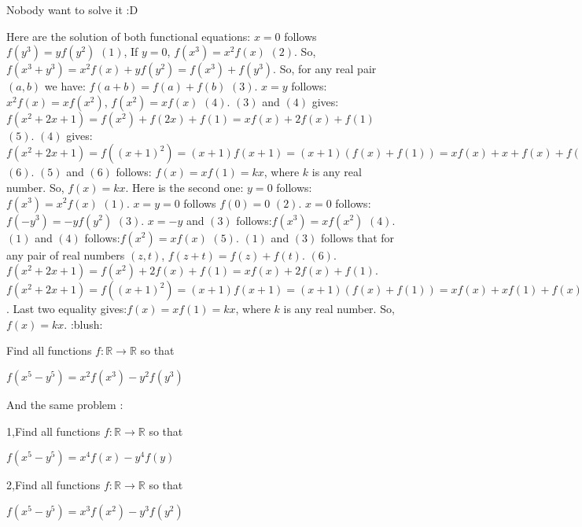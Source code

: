 \begin{mysolution}
	Nobody want to solve it  :D
\end{mysolution}



\begin{mysolution}
	Here are the solution of both functional equations:    
$ x = 0$ follows $ f(y^{3}) = yf(y^{2})$ $ (1)$, If $ y = 0$, $ f(x^{3}) = x^{2}f(x)$ $ (2)$. So, $ f(x^{3}+y^{3}) = x^{2}f(x)+yf(y^{2}) = f(x^{3})+f(y^{3})$. So, for any real pair $ (a,b)$ we have: $ f(a+b) = f(a)+f(b)$ $ (3)$. $ x = y$ follows: $ x^{2}f(x) = xf(x^{2})$, $ f(x^{2}) = xf(x)$ $ (4)$. 
$ (3)$ and $ (4)$ gives: $ f(x^{2}+2x+1) = f(x^{2})+f(2x)+f(1) = xf(x)+2f(x)+f(1)$ $ (5)$.
$ (4)$ gives: $ f(x^{2}+2x+1) = f((x+1)^{2}) = (x+1)f(x+1) = (x+1)(f(x)+f(1)) = xf(x)+x+f(x)+f(1)$ $ (6)$.
$ (5)$ and $ (6)$ follows: $ f(x) = xf(1) = kx$, where $ k$ is any real number. So, $ f(x) = kx$.
Here is the second one:
$ y = 0$ follows: $ f(x^{3}) = x^{2}f(x)$ $ (1)$.
$ x = y = 0$ follows $ f(0) = 0$ $ (2)$.
$ x = 0$ follows:$ f(-y^{3}) =-yf(y^{2})$ $ (3)$.
$ x =-y$ and $ (3)$ follows:$ f(x^{3}) = xf(x^{2})$ $ (4)$.
$ (1)$ and $ (4)$ follows:$ f(x^{2}) = xf(x)$ $ (5)$.
$ (1)$ and $ (3)$ follows that for any pair of real numbers $ (z,t)$, $ f(z+t) = f(z)+f(t)$. $ (6)$.
$ f(x^{2}+2x+1) = f(x^{2})+2f(x)+f(1) = xf(x)+2f(x)+f(1)$.
$ f(x^{2}+2x+1) = f((x+1)^{2}) = (x+1)f(x+1) = (x+1)(f(x)+f(1)) = xf(x)+xf(1)+f(x)+f(1)$.
Last two equality gives:$ f(x) = xf(1) = kx$, where $ k$ is any real number. So, $ f(x) = kx$.  :blush:
\end{mysolution}



\begin{mysolution}
	Find all functions $ f:\mathbb{R}\to\mathbb{R}$ so that 

$ f(x^{5}-y^{5})=x^{2}f(x^{3})-y^{2}f(y^{3})$

And the same problem :

1,Find all functions $ f:\mathbb{R}\to\mathbb{R}$ so that 

$ f(x^{5}-y^{5})=x^{4}f(x)-y^{4}f(y)$

2,Find all functions $ f:\mathbb{R}\to\mathbb{R}$ so that 

$ f(x^{5}-y^{5})=x^{3}f(x^{2})-y^{3}f(y^{2})$
\end{mysolution}



